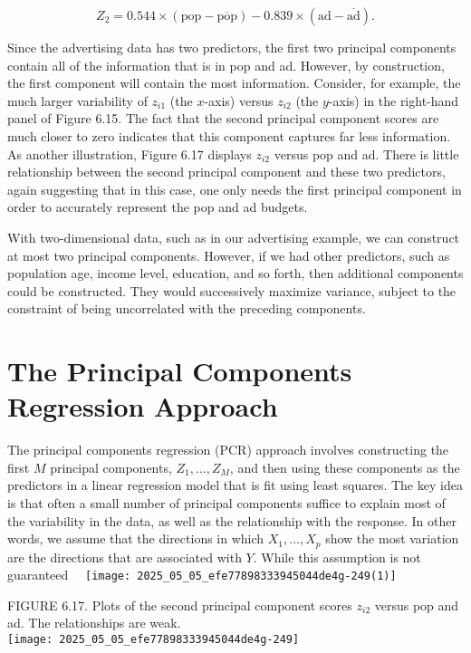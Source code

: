 \documentclass[10pt]{article}
\begin{document}
$$
Z_{2}=0.544 \times(\mathrm{pop}-\overline{\mathrm{pop}})-0.839 \times(\mathrm{ad}-\overline{\mathrm{ad}}) .
$$

Since the advertising data has two predictors, the first two principal components contain all of the information that is in pop and ad. However, by construction, the first component will contain the most information. Consider, for example, the much larger variability of $z_{i 1}$ (the $x$-axis) versus $z_{i 2}$ (the $y$-axis) in the right-hand panel of Figure 6.15. The fact that the second principal component scores are much closer to zero indicates that this component captures far less information. As another illustration, Figure 6.17 displays $z_{i 2}$ versus pop and ad. There is little relationship between the second principal component and these two predictors, again suggesting that in this case, one only needs the first principal component in order to accurately represent the pop and ad budgets.

With two-dimensional data, such as in our advertising example, we can construct at most two principal components. However, if we had other predictors, such as population age, income level, education, and so forth, then additional components could be constructed. They would successively maximize variance, subject to the constraint of being uncorrelated with the preceding components.

\section*{The Principal Components Regression Approach}
The principal components regression (PCR) approach involves constructing the first $M$ principal components, $Z_{1}, \ldots, Z_{M}$, and then using these components as the predictors in a linear regression model that is fit using least squares. The key idea is that often a small number of principal components suffice to explain most of the variability in the data, as well as the relationship with the response. In other words, we assume that the directions in which $X_{1}, \ldots, X_{p}$ show the most variation are the directions that are associated with $Y$. While this assumption is not guaranteed\
\
\texttt{[image: 2025\_05\_05\_efe77898333945044de4g-249(1)]}

FIGURE 6.17. Plots of the second principal component scores $z_{i 2}$ versus pop and ad. The relationships are weak.\\
\texttt{[image: 2025\_05\_05\_efe77898333945044de4g-249]}
\end{document}
